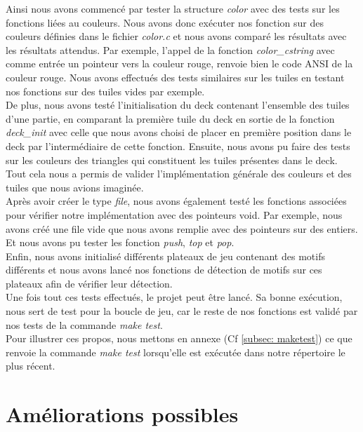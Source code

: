 \documentclass[11pt]{article}
\begin{document}
Ainsi nous avons commencé par tester la structure \emph{color} avec des tests sur les fonctions liées au couleurs. Nous avons donc exécuter nos fonction sur des couleurs définies dans le fichier \emph{color.c} et nous avons comparé les résultats avec les résultats attendus. Par exemple, l'appel de la fonction \emph{color\_cstring} avec comme entrée un pointeur vers la couleur rouge, renvoie bien le code ANSI de la couleur rouge. Nous avons effectués des tests similaires sur les tuiles en testant nos fonctions sur des tuiles vides par exemple.\\

De plus, nous avons testé l'initialisation du deck contenant l'ensemble des tuiles d'une partie, en comparant la première tuile du deck en sortie de la fonction \emph{deck\_init} avec celle que nous avons choisi de placer en première position dans le deck par l'intermédiaire de cette fonction. Ensuite, nous avons pu faire des tests sur les couleurs des triangles qui constituent les tuiles présentes dans le deck.\\

Tout cela nous a permis de valider l'implémentation générale des couleurs et des tuiles que nous avions imaginée.\\

Après avoir créer le type \emph{file}, nous avons également testé les fonctions associées pour vérifier notre implémentation avec des pointeurs void. Par exemple, nous avons créé une file vide que nous avons remplie avec des pointeurs sur des entiers. Et nous avons pu tester les fonction \emph{push}, \emph{top} et \emph{pop}. \\

Enfin, nous avons initialisé différents plateaux de jeu contenant des motifs différents et nous avons lancé nos fonctions de détection de motifs sur ces plateaux afin de vérifier leur détection. \\

Une fois tout ces tests effectués, le projet peut être lancé. Sa bonne exécution, nous sert de test pour la boucle de jeu, car le reste de nos fonctions est validé par nos tests de la commande \emph{make test}.\\

Pour illustrer ces propos, nous mettons en annexe (Cf \ref{subsec: maketest}) ce que renvoie la commande \emph{make test} lorsqu'elle est exécutée dans notre répertoire le plus récent.

\section{Améliorations possibles}
\end{document}
